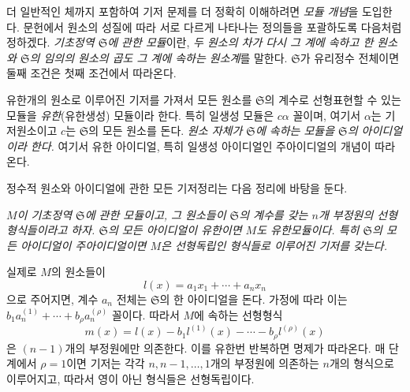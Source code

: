 더 일반적인 체까지 포함하여 기저 문제를 더 정확히 이해하려면 \emph{모듈 개념}을 도입한다. 문헌에서 원소의 성질에 따라 서로 다르게 나타나는 정의들을 포괄하도록 다음처럼 정하겠다. \emph{기초정역 \(\mathfrak S\)에 관한 모듈}이란, \emph{두 원소의 차가 다시 그 계에 속하고 한 원소와 \(\mathfrak S\)의 임의의 원소의 곱도 그 계에 속하는 원소계}를 말한다. \(\mathfrak S\)가 유리정수 전체이면 둘째 조건은 첫째 조건에서 따라온다.

유한개의 원소로 이루어진 기저를 가져서 모든 원소를 \(\mathfrak S\)의 계수로 선형표현할 수 있는 모듈을 \emph{유한}(유한생성) 모듈이라 한다. 특히 일생성 모듈은 \(c\alpha\) 꼴이며, 여기서 \(\alpha\)는 기저원소이고 \(c\)는 \(\mathfrak S\)의 모든 원소를 돈다. \emph{원소 자체가 \(\mathfrak S\)에 속하는 모듈을 \(\mathfrak S\)의 아이디얼이라 한다.} 여기서 유한 아이디얼, 특히 일생성 아이디얼인 주아이디얼의 개념이 따라온다.

정수적 원소와 아이디얼에 관한 모든 기저정리는 다음 정리에 바탕을 둔다.

\emph{\(M\)이 기초정역 \(\mathfrak S\)에 관한 모듈이고, 그 원소들이 \(\mathfrak S\)의 계수를 갖는 \(n\)개 부정원의 선형형식들이라고 하자. \(\mathfrak S\)의 모든 아이디얼이 유한이면 \(M\)도 유한모듈이다. 특히 \(\mathfrak S\)의 모든 아이디얼이 주아이디얼이면 \(M\)은 선형독립인 형식들로 이루어진 기저를 갖는다.}

실제로 \(M\)의 원소들이
\[
l(x)=a_1x_1+\cdots+a_nx_n
\]
으로 주어지면, 계수 \(a_n\) 전체는 \(\mathfrak S\)의 한 아이디얼을 돈다. 가정에 따라 이는 \(b_1a_n^{(1)}+\cdots+b_\rho a_n^{(\rho)}\) 꼴이다. 따라서 \(M\)에 속하는 선형형식
\[
m(x)=l(x)-b_1l^{(1)}(x)-\cdots-b_\rho l^{(\rho)}(x)
\]
은 \((n-1)\)개의 부정원에만 의존한다. 이를 유한번 반복하면 명제가 따라온다. 매 단계에서 \(\rho=1\)이면 기저는 각각 \(n,n-1,\ldots,1\)개의 부정원에 의존하는 \(n\)개의 형식으로 이루어지고, 따라서 영이 아닌 형식들은 선형독립이다.

